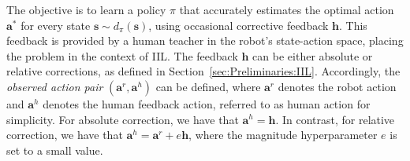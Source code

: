 The objective is to learn a policy $\pi$ that accurately estimates the optimal action $\bm a^*$ for every state $\bm s \sim d_\pi(\bm s)$, using occasional corrective feedback $\bm h$.
This feedback is provided by a human teacher in the robot's state-action space, placing the problem in the context of IIL.
The feedback $\bm h$ can be either absolute or relative corrections, as defined in Section~\ref{sec:Preliminaries:IIL}.
Accordingly, the \textit{observed action pair} $(\bm a^r, \bm a^h)$ can be defined, where $\bm a^r$ denotes the robot action and $\bm a^h$ denotes the human feedback action, referred to as human action for simplicity. 
For absolute correction, we have that $\bm a^h = \bm h$. 
In contrast, for relative correction, we have that $\bm a^h = \bm a^r + e \bm h$, where the magnitude hyperparameter $e$ is set to a small value.



